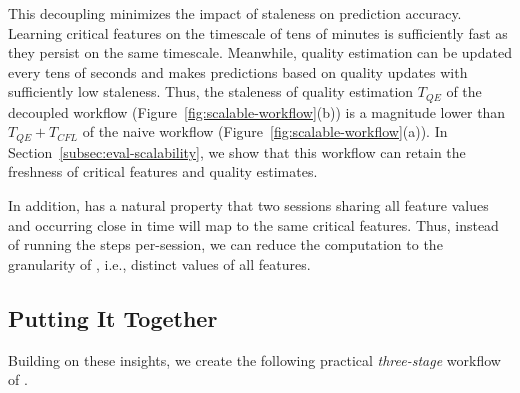 This decoupling 
minimizes the impact of staleness on prediction accuracy.
Learning critical features on the timescale of tens 
of minutes
is sufficiently fast as they persist 
on the same timescale.
Meanwhile, %
quality estimation can be updated every tens of seconds 
and makes predictions based on quality updates with sufficiently
low staleness.
Thus, the staleness of quality estimation $T_{QE}$ of
the decoupled workflow (Figure~\ref{fig:scalable-workflow}(b))
is a magnitude lower than $T_{QE}+T_{CFL}$ of the naive workflow 
(Figure~\ref{fig:scalable-workflow}(a)).
In Section~\ref{subsec:eval-scalability}, we show that 
this workflow can retain the freshness of critical features and quality estimates.


In addition, \dda has a natural property that two sessions sharing 
all feature values and occurring close in time will map to the 
same critical features. Thus, instead of running the steps 
per-session, we can reduce the computation to the granularity of 
{\em \leafs}, i.e., distinct values of all features.


\subsection{Putting It Together}

Building on these insights, we create 
the following practical {\em three-stage} workflow of \dda.

